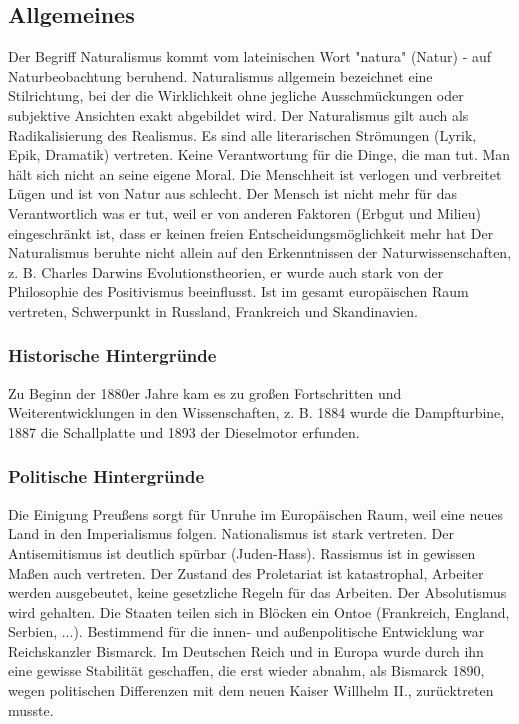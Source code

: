 \documentclass[12pt,a4paper]{article}
\begin{document}
\subsection{Allgemeines}

Der Begriff Naturalismus kommt vom lateinischen Wort "natura" (Natur) - auf Naturbeobachtung beruhend. Naturalismus allgemein bezeichnet eine Stilrichtung, bei der die Wirklichkeit ohne jegliche Ausschmückungen oder subjektive Ansichten exakt abgebildet wird. Der Naturalismus gilt auch als Radikalisierung des Realismus. Es sind alle literarischen Strömungen (Lyrik, Epik, Dramatik) vertreten. 
\newline
\newline
Keine Verantwortung für die Dinge, die man tut. Man hält sich nicht an seine eigene Moral. Die Menschheit ist verlogen und verbreitet Lügen und ist von Natur aus schlecht. Der Mensch ist nicht mehr für das Verantwortlich was er tut, weil er von anderen Faktoren (Erbgut und Milieu) eingeschränkt ist, dass er keinen freien Entscheidungsmöglichkeit mehr hat
\newline
\newline
Der Naturalismus beruhte nicht allein auf den Erkenntnissen der Naturwissenschaften, z. B. Charles Darwins Evolutionstheorien, er wurde auch stark von der Philosophie des Positivismus beeinflusst. Ist im gesamt europäischen Raum vertreten, Schwerpunkt in Russland, Frankreich und Skandinavien.
	
\subsubsection{Historische Hintergründe}	

Zu Beginn der 1880er Jahre kam es zu großen Fortschritten und Weiterentwicklungen in den Wissenschaften, z. B. 1884 wurde die Dampfturbine, 1887 die Schallplatte und 1893 der Dieselmotor erfunden.

\subsubsection{Politische Hintergründe}

Die Einigung Preußens sorgt für Unruhe im Europäischen Raum, weil eine neues Land in den Imperialismus folgen. Nationalismus ist stark vertreten. Der Antisemitismus ist deutlich spürbar (Juden-Hass). Rassismus ist in gewissen Maßen auch vertreten. Der Zustand des Proletariat ist katastrophal, Arbeiter werden ausgebeutet, keine gesetzliche Regeln für das Arbeiten. Der Absolutismus wird gehalten. Die Staaten teilen sich in Blöcken ein Ontoe (Frankreich, England, Serbien, ...).	
\newline
Bestimmend für die innen- und außenpolitische Entwicklung war Reichskanzler Bismarck. Im Deutschen Reich und in Europa wurde durch ihn eine gewisse Stabilität geschaffen, die erst wieder abnahm, als Bismarck 1890, wegen politischen Differenzen mit dem neuen Kaiser Willhelm II., zurücktreten musste.
	
\end{document}
